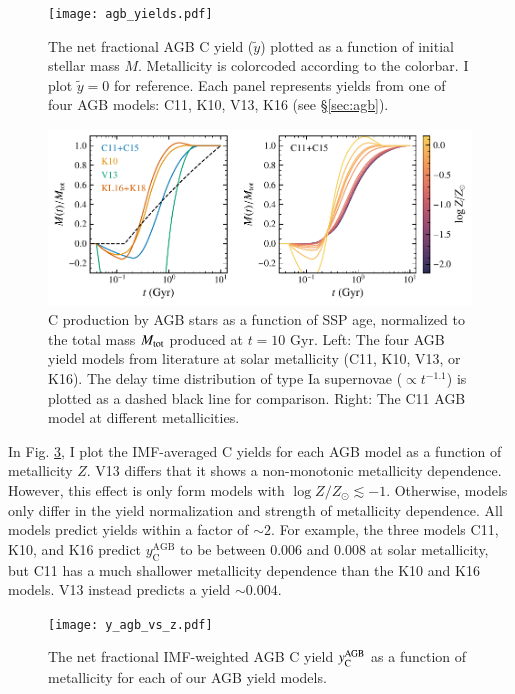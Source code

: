 \documentclass[12pt,oneside]{report}
\newcommand{\Ycagb}{\ensuremath{y_{\rm C}^{\rm AGB}}}
\begin{document}
\begin{figure}
    \centering
 	    \texttt{[image: agb\_yields.pdf]}
        \caption[AGB C yields]{The net fractional AGB C yield ($\tilde{y}$) plotted as a function of initial stellar mass $M$. Metallicity is colorcoded according to the colorbar. I plot $\tilde{y}=0$ for reference. Each panel represents yields from one of four AGB models: C11, K10, V13, K16 (see \S \ref{sec:agb}). }
        \label{fig:y_agb}
\end{figure}
\begin{figure}
    \includegraphics[scale=1]{y_agb_t2.pdf}

    \caption[AGB yields delay time distribution]{
        C production by AGB stars as a function of SSP age, normalized to the total mass $M_{\rm tot}$ produced at $t=10$ Gyr. Left: The four AGB yield models from literature at solar metallicity (C11, K10, V13, or K16). The delay time distribution of type Ia supernovae ($\propto t^{-1.1}$) is plotted as a dashed black line for comparison. Right: The C11 AGB model at different metallicities. }
    \label{fig:agb-ssp}
\end{figure}


In Fig. \ref{fig:yagb-z}, I plot the IMF-averaged C yields for each AGB model as a function of metallicity $Z$.
V13 differs that it shows a non-monotonic metallicity dependence. However, this effect is only form models with $\log Z/Z_\odot \lesssim -1$.
Otherwise, models only differ in the yield normalization and strength of metallicity dependence. All models predict yields within a factor of $\sim 2$.
For example, the three models C11, K10, and K16 predict $y_\text{C}^\text{AGB}$ to be between 0.006 and 0.008 at solar metallicity, but C11 has a much shallower metallicity dependence than the K10 and K16 models. V13 instead predicts a yield $\sim 0.004$.

\begin{figure}
    \centering
    \texttt{[image: y\_agb\_vs\_z.pdf]}

    \caption[AGB yield metallicity dependence]{The net fractional IMF-weighted AGB C yield $\Ycagb$ as a function of metallicity for each of our AGB yield models.
    }
    \label{fig:yagb-z}
\end{figure}
\end{document}
